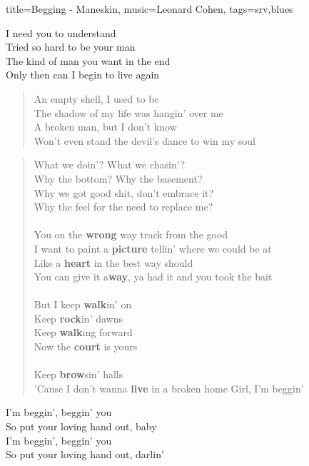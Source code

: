 \begin{song}{title={Begging - Maneskin}, music={Leonard Cohen}, tags={srv,blues}}
\begin{bridge}
	I need you to understand
\\
	Tried so hard to be your man
\\
	The kind of man you want in the end
\\
	Only then can I begin to live again 
\end{bridge}
\begin{verse}
	An empty shell, I used to be
\\
	The shadow of my life was hangin' over me
\\
	A broken man, but I don't know
\\
	Won't even stand the devil's dance to win my soul
\end{verse}
\begin{verse}
	What we doin'? What we chasin'?
\\
	Why the bottom? Why the basement? \\
	Why we got good shit, don't embrace it? \\
	Why the feel for the need to replace me?
\\ \\
	You on the \textbf{wrong} way track from the good
\\
	I want to paint a \textbf{picture} tellin' where we could be at
\\
	Like a \textbf{heart} in the best way should
\\
	You can give it a\textbf{way}, ya had it and you took the bait\\
\\
	But I keep \textbf{walk}in' on
\\
	Keep \textbf{rock}in' dawns
\\
	Keep \textbf{walk}ing forward
\\
	Now the \textbf{court} is yours
\\ \\
	Keep \textbf{brow}sin' halls
\\
	'Cause I don't wanna \textbf{live} in a broken home
	Girl, I'm beggin'
\end{verse}

\begin{chorus}
	I'm beggin', beggin' you
\\
	So put your loving hand out, baby
\\
	I'm beggin', beggin' you
\\
	So put your loving hand out, darlin'
\end{chorus}


\end{song}
